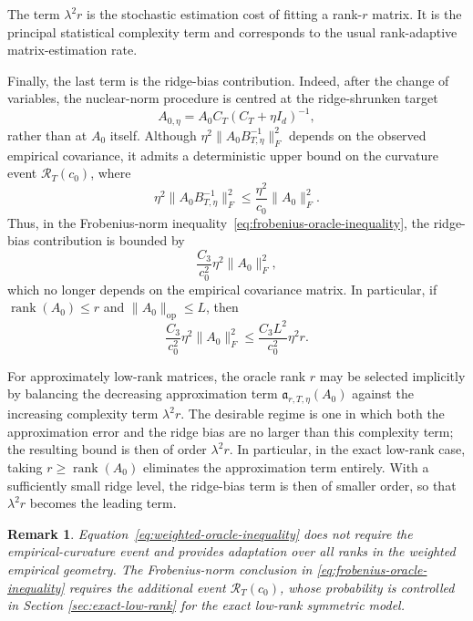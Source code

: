 \documentclass[11pt]{article}
\newtheorem{remark}[theorem]{Remark}
\begin{document}
The term $\lambda^2 r$ is the stochastic estimation cost of fitting a
rank-$r$ matrix. It is the principal statistical complexity term and
corresponds to the usual rank-adaptive matrix-estimation rate. 


Finally, the last term is the ridge-bias contribution. Indeed, after the change
of variables, the nuclear-norm procedure is centred at the
ridge-shrunken target
\[
A_{0,\eta}
=
A_0C_T(C_T+\eta I_d)^{-1},
\]
rather than at \(A_0\) itself. Although
\(\eta^2\|A_0B_{T,\eta}^{-1}\|_F^2\) depends on the observed empirical
covariance, it admits a deterministic upper bound on the curvature
event $\mathcal R_T(c_0)$, where 
\[
\eta^2\|A_0B_{T,\eta}^{-1}\|_F^2
\le
\frac{\eta^2}{c_0}\|A_0\|_F^2.
\]
Thus, in the Frobenius-norm inequality~\eqref{eq:frobenius-oracle-inequality},
the ridge-bias contribution is bounded by
\[
\frac{C_3}{c_0^2}\eta^2\|A_0\|_F^2,
\]
which no longer depends on the empirical
covariance matrix. In particular, if
\(\operatorname{rank}(A_0)\le r\) and
\(\|A_0\|_{\mathrm{op}}\le L\), then
\[
\frac{C_3}{c_0^2}\eta^2\|A_0\|_F^2
\le
\frac{C_3L^2}{c_0^2}\eta^2r.
\]

For approximately low-rank matrices, the oracle rank $r$ may be selected
implicitly by balancing the decreasing approximation term
$\mathfrak a_{r,T,\eta}(A_0)$ against the increasing complexity term
$\lambda^2r$. The desirable regime is one in which both the
approximation error and the ridge bias are no larger than this
complexity term; the resulting bound is then of order $\lambda^2r$.
In particular, in the exact low-rank case, taking
$r\ge \operatorname{rank}(A_0)$ eliminates the approximation term
entirely. With a sufficiently small ridge level, the ridge-bias term is
then of smaller order, so that $\lambda^2r$ becomes the leading term.

\begin{remark}
Equation~\eqref{eq:weighted-oracle-inequality} does not require the
empirical-curvature event and provides adaptation over all ranks in the
weighted empirical geometry. The Frobenius-norm conclusion in \eqref{eq:frobenius-oracle-inequality} requires the additional event $\mathcal R_T(c_0)$, whose probability is controlled in
Section \ref{sec:exact-low-rank} for the exact low-rank symmetric model. 
\end{remark}
\end{document}
